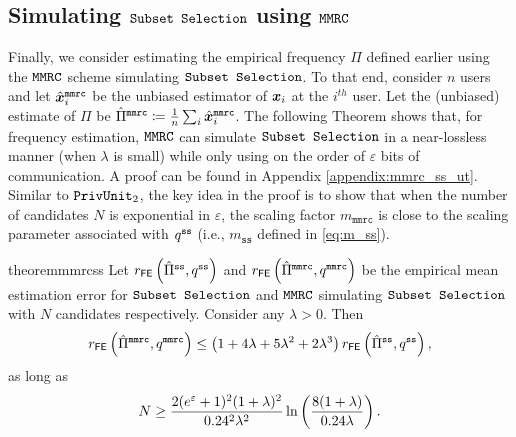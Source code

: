 
\subsection{Simulating \texorpdfstring{$\texttt{Subset Selection}$}{Subset Selection} using \texorpdfstring{$\texttt{MMRC}$}{MMRC}}
\label{subsec:sim_ss1}

Finally, we consider estimating the empirical frequency $\Pi$ defined earlier using the $\texttt{MMRC}$ scheme simulating $\texttt{Subset Selection}$. To that end, consider $n$ users and let $\hat{{\boldsymbol{x}}}^{\texttt{mmrc}}_i$ be the unbiased estimator of ${\boldsymbol{x}}_i$ at the $i^{th}$ user. Let the (unbiased) estimate of $\Pi$ be $\hat{\Pi}^{ \texttt{mmrc}} \coloneqq \frac{1}{n}\sum_i \hat{{\boldsymbol{x}}}^\texttt{mmrc}_i$. 
The following Theorem shows that, for frequency estimation, $\texttt{MMRC}$ can simulate $\texttt{Subset Selection}$ in a near-lossless manner (when $\lambda$ is small) while only using on the order of $\varepsilon$ bits of communication. A proof can be found in Appendix \ref{appendix:mmrc_ss_ut}. Similar to $\texttt{PrivUnit}_2$, the key idea in the proof is to show that when the number of candidates $N$ is exponential in $\varepsilon$, the scaling factor $m_{\texttt{mmrc}}$ is close to the scaling parameter associated with $q^{\texttt{ss}}$ (i.e., $m_{\texttt{ss}}$ defined in \eqref{eq:m_ss}).


\begin{restatable}{theorem}{mmrcss}
\label{thm:fe_mmrc_ss}
 Let $r_{\mathsf{FE}} \left( \hat{\Pi}^\texttt{ss}, q^{\texttt{ss}} \right)$ and $r_{\mathsf{FE}} \left( \hat{\Pi}^\texttt{mmrc}, q^{\texttt{mmrc}} \right)$ be the empirical mean estimation error for \emph{$\texttt{Subset Selection}$} and \emph{$\texttt{MMRC}$} simulating \emph{$\texttt{Subset Selection}$} with $N$ candidates respectively. Consider any $\lambda > 0$. Then
 \begin{equation}
     r_{\mathsf{FE}} \left( \hat{\Pi}^{ \texttt{mmrc}}, q^{\texttt{mmrc}} \right) \leq  
     \left( 1+4\lambda+5\lambda^2+2\lambda^3 \right) r_{\mathsf{FE}} \left( \hat{\Pi}^{ \texttt{ss}}, q^{\texttt{ss}} \right),
 \end{equation}
 as long as 
  \begin{align}\label{eq:N_bdd_mmrc_ss}
      N\geq \frac{2(e^{\varepsilon}+1)^2(1+\lambda)^2}{0.24^2\lambda^2}\ln\left( \frac{8(1+\lambda)}{0.24\lambda}\right).
  \end{align}
 \end{restatable}

